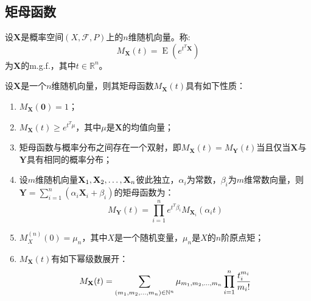 \subsection{矩母函数}
\begin{definition}
	设$\mathbf{X}$是概率空间$(X,\mathscr{F},P)$上的$n$维随机向量。称:
	\begin{equation*}
		M_\mathbf{X}(t)=\operatorname{E}(e^{t^T\mathbf{X}})
	\end{equation*}
	为$\mathbf{X}$的\gls{m.g.f.}，其中$t\in\mathbb{R}^{n}$。
\end{definition}
\begin{property}\label{prop:m.g.f.}
	设$\mathbf{X}$是一个$n$维随机向量，则其矩母函数$M_\mathbf{X}(t)$具有如下性质：
	\begin{enumerate}
		\item $M_\mathbf{X}(\mathbf{0})=1$；
		\item $M_\mathbf{X}(t)\geqslant e^{t^T\mu}$，其中$\mu$是$\mathbf{X}$的均值向量；
		\item 矩母函数与概率分布之间存在一个双射，即$M_\mathbf{X}(t)=M_\mathbf{Y}(t)$当且仅当$\mathbf{X}$与$\mathbf{Y}$具有相同的概率分布；
		\item 设$m$维随机向量$\mathbf{X}_1, \mathbf{X}_2, \dots, \mathbf{X}_{n}$彼此独立，$\alpha_i$为常数，$\beta_i$为$m$维常数向量，则$\mathbf{Y}=\sum\limits_{i=1}^{n}(\alpha_i\mathbf{X}_i+\beta_i)$的矩母函数为：
		\begin{equation*}
			M_\mathbf{Y}(t)=\prod_{i=1}^ne^{t^T\beta_i}M_{\mathbf{X}_i}(\alpha_it)
		\end{equation*}
		\item $M_X^{(n)}(0)=\mu_n$，其中$X$是一个随机变量，$\mu_n$是$X$的$n$阶原点矩；
		\item $M_\mathbf{X}(t)$有如下幂级数展开：
		\begin{equation*}
			M_\mathbf{X}(t)=\sum_{(m_1, m_2, \dots, m_{n})\in\mathbb{N}^n}\mu_{m_1, m_2, \dots, m_{n}}\prod_{i=1}^{n}\frac{t_i^{m_i}}{m_i!}
		\end{equation*}
	\end{enumerate}
\end{property}
